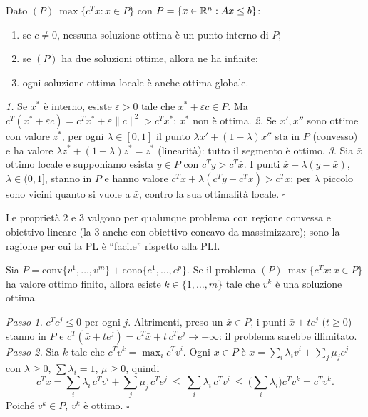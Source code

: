 \begin{prop}
Dato $(P)\ \max\{c^Tx: x\in P\}$ con $P=\{x\in\mathbb{R}^n:Ax\le b\}$:
\begin{enumerate}[nosep]
\item se $c\ne0$, nessuna soluzione ottima è un punto interno di $P$;
\item se $(P)$ ha due soluzioni ottime, allora ne ha infinite;
\item ogni soluzione ottima locale è anche ottima globale.
\end{enumerate}
\end{prop}
\begin{dimo}
\emph{1.} Se $x^*$ è interno, esiste $\varepsilon>0$ tale che $x^*+\varepsilon c\in P$. Ma $c^T(x^*+\varepsilon c)=c^Tx^*+\varepsilon\|c\|^2>c^Tx^*$: $x^*$ non è ottima.
\emph{2.} Se $x',x''$ sono ottime con valore $z^*$, per ogni $\lambda\in[0,1]$ il punto $\lambda x'+(1-\lambda)x''$ sta in $P$ (convesso) e ha valore $\lambda z^*+(1-\lambda)z^*=z^*$ (linearità): tutto il segmento è ottimo.
\emph{3.} Sia $\bar x$ ottimo locale e supponiamo esista $y\in P$ con $c^Ty>c^T\bar x$. I punti $\bar x+\lambda(y-\bar x)$, $\lambda\in(0,1]$, stanno in $P$ e hanno valore $c^T\bar x+\lambda(c^Ty-c^T\bar x)>c^T\bar x$; per $\lambda$ piccolo sono vicini quanto si vuole a $\bar x$, contro la sua ottimalità locale. \hfill$\square$
\end{dimo}
Le proprietà 2 e 3 valgono per qualunque problema con regione convessa e obiettivo lineare (la 3 anche con obiettivo concavo da massimizzare); sono la ragione per cui la PL è ``facile'' rispetto alla PLI.

\begin{prop}
Sia $P=\mathrm{conv}\{v^1,\dots,v^m\}+\mathrm{cono}\{e^1,\dots,e^p\}$. Se il problema $(P)\ \max\{c^Tx: x\in P\}$ ha valore ottimo finito, allora esiste $k\in\{1,\dots,m\}$ tale che $v^k$ è una soluzione ottima.
\end{prop}
\begin{dimo}
\emph{Passo 1.} $c^Te^j\le0$ per ogni $j$. Altrimenti, preso un $\bar x\in P$, i punti $\bar x+te^j$ ($t\ge0$) stanno in $P$ e $c^T(\bar x+te^j)=c^T\bar x+t\,c^Te^j\to+\infty$: il problema sarebbe illimitato.
\emph{Passo 2.} Sia $k$ tale che $c^Tv^k=\max_ic^Tv^i$. Ogni $x\in P$ è $x=\sum_i\lambda_iv^i+\sum_j\mu_je^j$ con $\lambda\ge0$, $\sum\lambda_i=1$, $\mu\ge0$, quindi
\[ c^Tx=\sum_i\lambda_i\,c^Tv^i+\sum_j\mu_j\,c^Te^j\ \le\ \sum_i\lambda_i\,c^Tv^i\ \le\ \Big(\sum_i\lambda_i\Big)c^Tv^k=c^Tv^k. \]
Poiché $v^k\in P$, $v^k$ è ottimo. \hfill$\square$
\end{dimo}

